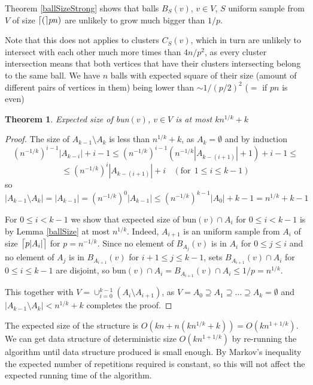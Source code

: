 \documentclass[shortabstract, lic, english]{iithesis}
\theoremstyle{definition} \newtheorem{definition}{Definition}[chapter]
\theoremstyle{plain} \newtheorem{remark}[definition]{Observation}
\theoremstyle{plain} \newtheorem{theorem}[definition]{Theorem}
\theoremstyle{plain} \newtheorem{lemma}[definition]{Lemma}
\theoremstyle{plain} \newtheorem{conjecture}[definition]{Conjecture}
\DeclarePairedDelimiter{\ceil}{\lceil}{\rceil}
\begin{document}
Theorem \ref{ballSizeStrong} shows that balls $B_S(v)$, $v \in V$, $S$ uniform sample from $V$ of size $\ceil(pn)$ are unlikely to grow much bigger than $1/p$.

Note that this does not applies to clusters $C_S(v)$, which in turn are unlikely to intersect with each other much more times than $4n/p^2$,
as every cluster intersection means that both vertices that have their clusters intersecting belong to the same ball.
We have $n$ balls with expected square of their size (amount of different pairs of vertices in them) being lower than $\sim 1/(p/2)^2$ ($=$ if $p n$ is even)

\begin{theorem}
    Expected size of bun$(v)$, $v \in V$ is at most $kn^{1/k} + k$
\end{theorem}
\begin{proof}
    The size of $A_{k-1} \setminus A_k$ is less than $n^{1/k} + k$, as $A_k = \emptyset$ and by induction
    $$(n^{-1/k})^{i-1} |A_{k-i}| + i - 1 \leq (n^{-1/k})^{i-1} (n^{-1/k} |A_{k-(i+1)}| + 1) + i - 1 \leq$$ 
    $$\leq (n^{-1/k})^{i} |A_{k-(i+1)}| + i~~~~(\text{for}~~1 \leq i \leq k-1)$$
    so $|A_{k-1} \setminus A_k| = |A_{k-1}| = (n^{-1/k})^0 |A_{k-1}| \leq (n^{-1/k})^{k-1} |A_{0}| + k - 1 = n^{1/k} + k - 1$
    
    For $0 \leq i < k-1$ we show that expected size of bun$(v) \cap A_i$ for $0 \leq i < k-1$ is by Lemma \ref{ballSize}
    at most $n^{1/k}$. Indeed, $A_{i+1}$ is an uniform sample from $A_i$ of size $\ceil[\big]{p |A_i|}$ for $p = n^{-1/k}$.
    Since no element of $B_{A_j}(v)$ is in $A_i$ for $0 \leq j \leq i$ and
    no element of $A_{j}$ is in $B_{A_{i+1}}(v)$ for $i+1 \leq j \leq k-1$, sets $B_{A_{i+1}}(v) \cap A_i$ for $0 \leq i \leq k-1$ are disjoint, so
    bun$(v) \cap A_i = B_{A_{i+1}}(v) \cap A_i \leq 1/p = n^{1/k}$.
    
    This together with $V = \cup_{i=0}^{k-1} (A_i \setminus A_{i+1})$, as $V = A_0 \supseteq A_1 \supseteq \ldots \supseteq A_k = \emptyset$
    and $|A_{k-1} \setminus A_k| < n^{1/k} + k$ completes the proof.
\end{proof}

The expected size of the structure is $O(kn + n(kn^{1/k}+k)) = O(kn^{1 + 1/k})$.
We can get data structure of deterministic size $O(kn^{1 + 1/k})$ by re-running the algorithm
until data structure produced is small enough.
By Markov's inequality the expected number of repetitions required is constant, so this will not
affect the expected running time of the algorithm.
\end{document}
